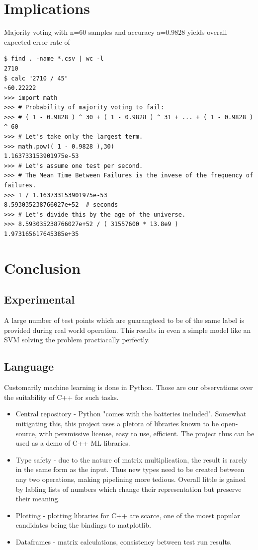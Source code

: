 \documentclass{article}
\begin{document}
\section{Implications}
Majority voting with n=60 samples and accuracy a=0.9828 yields overall expected error rate of
\begin{verbatim}
$ find . -name *.csv | wc -l
2710
$ calc "2710 / 45"
~60.22222
>>> import math
>>> # Probability of majority voting to fail:
>>> # ( 1 - 0.9828 ) ^ 30 + ( 1 - 0.9828 ) ^ 31 + ... + ( 1 - 0.9828 ) ^ 60
>>> # Let's take only the largest term.
>>> math.pow(( 1 - 0.9828 ),30)
1.163733153901975e-53
>>> # Let's assume one test per second.
>>> # The Mean Time Between Failures is the invese of the frequency of failures.
>>> 1 / 1.163733153901975e-53
8.593035238766027e+52  # seconds
>>> # Let's divide this by the age of the universe.
>>> 8.593035238766027e+52 / ( 31557600 * 13.8e9 )
1.973165617645385e+35
\end{verbatim}


\section{Conclusion}
\subsection{Experimental}
A large number of test points which are guarangteed to be of the same label is provided during real world operation.
This results in even a simple model like an SVM solving the problem practiacally perfectly.

\subsection{Language}
Customarily machine learning is done in Python.
Those are our observations over the suitability of C++ for such tasks.
\begin{itemize}
\item{Central repository - Python "comes with the batteries included".
                           Somewhat mitigating this, this project uses a pletora of libraries known to be open-source, with persmissive license, easy to use, efficient.
                           The project thus can be used as a demo of C++ ML libraries.
}
\item{Type safety - due to the nature of matrix multiplication, the result is rarely in the same form as the input.
                    Thus new types need to be created between any two operations, making pipelining more tedious.
                    Overall little is gained by labling lists of numbers which change their representation but preserve their meaning.}
\item{Plotting - plotting libraries for C++ are scarce, one of the moest popular candidates being the bindings to matplotlib.}
\item{Dataframes - matrix calculations, consistency between test run results.}
\end{itemize}


\printbibliography
\end{document}
